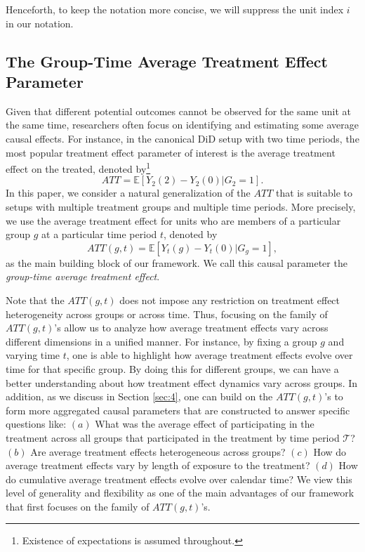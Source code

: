 \documentclass[11pt]{article}%
\theoremstyle{plain}
\numberwithin{sassumption}{section}
\numberwithin{equation}{section}
\begin{document}
Henceforth, to keep the notation more concise, we will suppress the unit index
$i$ in our notation.

\subsection{The Group-Time Average Treatment Effect Parameter}

Given that different potential outcomes cannot be observed for the same unit
at the same time, researchers often focus on identifying and estimating some
average causal effects. For instance, in the canonical DiD setup {with two
time periods}, the most popular treatment effect parameter of interest is the
average treatment effect on the treated, denoted by\footnote{Existence of
expectations is assumed throughout.}
\[
ATT=\mathbb{E}[Y_{2}(2)-Y_{2}(0)|G_{2}=1].
\]
In this paper, we consider a natural generalization of the $ATT$ that is
suitable to setups with multiple treatment groups and multiple time periods.
More precisely, we use the average treatment effect for units who are members
of a particular group $g$ at a particular time period $t$, denoted by
\[
ATT(g,t)=\mathbb{E}[Y_{t}(g)-Y_{t}(0)|G_{g}=1],
\]
as the main building block of our framework. We call this causal parameter the
\textit{group-time average treatment effect}.

Note that the $ATT\left(  g,t\right)  $ does not impose any restriction on
treatment effect heterogeneity across groups or across time. Thus, focusing on
the family of $ATT(g,t)$'s allow us to analyze how average treatment effects
vary across different dimensions in a unified manner. For instance, by
fixing a group $g$ and varying time $t$, one is able to highlight how average
treatment effects evolve over time for that specific group. By doing this for
different groups, we can have a better understanding about how treatment
effect dynamics vary across groups. In addition, as we discuss in Section
\ref{sec:4}, one can build on the $ATT(g,t)$'s to form more aggregated causal
parameters that are constructed to answer specific questions like: $\left(
a\right)  $ What was the average effect of participating in the treatment
across all groups that participated in the treatment by time period
$\mathcal{T}$? $\left(  b\right)  $ Are average treatment effects
heterogeneous across groups? $\left(  c\right)  $ How do average treatment
effects vary by length of exposure to the treatment? $\left(  d\right)  $
How do cumulative average treatment effects evolve over calendar time? We view
this level of generality and flexibility as one of the main advantages of our
framework that first focuses on the family of $ATT(g,t)$'s.
\end{document}
